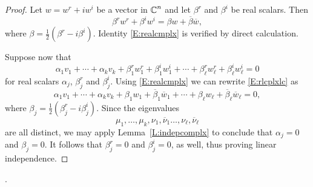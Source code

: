 \documentclass{ximera}
\begin{document}
\begin{proof}  Let $w=w^r+iw^i$ be a vector in $\mbox{$\mathbb{C}$}^n$ and let $\beta^r$ and
$\beta^i$ be real scalars.  Then 
\begin{equation}  \label{E:realcmplx}
\beta^rw^r + \beta^iw^i = \beta w + \overline{\beta} \overline{w},
\end{equation}
where $\beta = \frac{1}{2}(\beta^r-i\beta^i)$.  Identity \eqref{E:realcmplx} 
is verified by direct calculation.

Suppose now that 
\begin{equation}  \label{E:rlcplxlc} 
\alpha_1v_1+\cdots+\alpha_kv_k + \beta_1^rw_1^r+\beta_1^iw_1^i + \cdots +
\beta_\ell^rw_\ell^r+\beta_\ell^iw_\ell^i = 0
\end{equation}
for real scalars $\alpha_j$, $\beta_j^r$ and $\beta_j^i$.  Using 
\eqref{E:realcmplx} we can rewrite \eqref{E:rlcplxlc} as
\[
\alpha_1v_1+\cdots+\alpha_kv_k + \beta_1w_1+\overline{\beta}_1\overline{w}_1 
+ \cdots + \beta_\ell w_\ell+\overline{\beta}_\ell\overline{w}_\ell = 0,
\]
where $\beta_j = \frac{1}{2}(\beta_j^r-i\beta_j^i)$.  Since the eigenvalues 
\[
\mu_1,\ldots,\mu_k,\nu_1,\overline{\nu}_1\ldots,\nu_\ell,\overline{\nu}_\ell
\]
are all distinct, we may apply Lemma~\ref{L:indepcomplx} to conclude that 
$\alpha_j=0$ and $\beta_j=0$.  It follows that $\beta_j^r=0$ and
$\beta_j^i=0$, as well, thus proving linear independence.  \end{proof}. 
\end{document}

